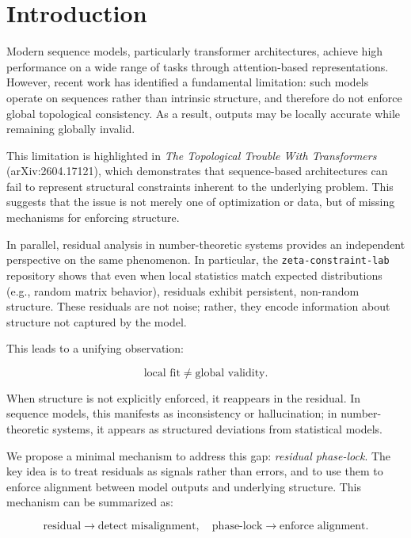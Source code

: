 \section{Introduction}

Modern sequence models, particularly transformer architectures, achieve high performance on a wide range of tasks through attention-based representations. However, recent work has identified a fundamental limitation: such models operate on sequences rather than intrinsic structure, and therefore do not enforce global topological consistency. As a result, outputs may be locally accurate while remaining globally invalid.

This limitation is highlighted in \textit{The Topological Trouble With Transformers} (arXiv:2604.17121), which demonstrates that sequence-based architectures can fail to represent structural constraints inherent to the underlying problem. This suggests that the issue is not merely one of optimization or data, but of missing mechanisms for enforcing structure.

In parallel, residual analysis in number-theoretic systems provides an independent perspective on the same phenomenon. In particular, the \texttt{zeta-constraint-lab} repository shows that even when local statistics match expected distributions (e.g., random matrix behavior), residuals exhibit persistent, non-random structure. These residuals are not noise; rather, they encode information about structure not captured by the model.

This leads to a unifying observation:

\begin{equation}
\text{local fit} \neq \text{global validity}.
\end{equation}

When structure is not explicitly enforced, it reappears in the residual. In sequence models, this manifests as inconsistency or hallucination; in number-theoretic systems, it appears as structured deviations from statistical models.

We propose a minimal mechanism to address this gap: \textit{residual phase-lock}. The key idea is to treat residuals as signals rather than errors, and to use them to enforce alignment between model outputs and underlying structure. This mechanism can be summarized as:

\begin{equation}
\text{residual} \rightarrow \text{detect misalignment}, \quad
\text{phase-lock} \rightarrow \text{enforce alignment}.
\end{equation}

